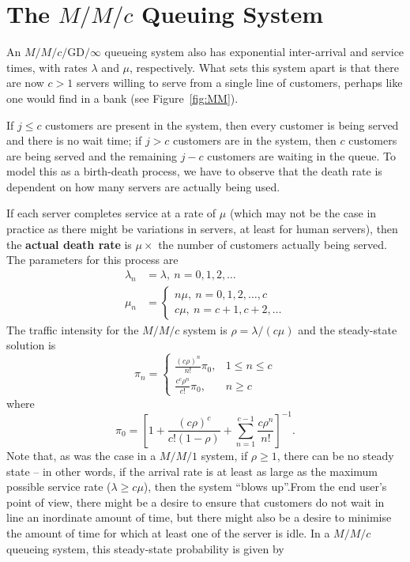 \section{The $M/M/c$ Queuing System}
An $M/M/c/\textrm{GD}/\infty$ queueing system also has exponential inter-arrival and service times, with rates $\lambda$ and $\mu$, respectively. What sets this system apart is that there are now $c>1$ servers willing to serve from a single line of customers, perhaps like one would find in a bank (see Figure~\ref{fig:MM}). \par If $j \leq c$ customers are present in the system, then every customer is being served and there is no wait time; if $j > c$ customers are in the system, then $c$ customers are being served and the remaining $j - c$ customers are waiting in the queue. \newl
To model this as a birth-death process, we have to observe that the death rate is dependent on how many servers are actually being used. \par If each server completes service at a rate of $\mu$ (which may not be the case in practice as there might be variations in servers, at least for human servers), then the \textbf{actual death rate} is $\mu \times$ the number of customers actually being served. The parameters for this process are
\begin{align*}
\lambda_{n} &= \lambda, \ n=0,1,2,\ldots \\ 
\mu_n &= \begin{cases}n\mu, \ n=0,1,2, \ldots, c \\
 c\mu,\  n=c+1,c+2,\ldots
\end{cases}
\end{align*}
The traffic intensity for the $M/M/c$ system is $\rho = \lambda/(c \mu)$ and the steady-state solution is 
$$
 \pi_{n} = 
\begin{cases}
     \frac{\left(c \rho\right)^{n}}{n!} \pi_{0},      & \text{$1\leq n \leq c$}  \\ 
     \frac{c^{c} \rho^{n}}{c!} \pi_{0},   & \text{$n \geq c$} 
\end{cases}
$$
where 
$$
\pi_{0} = \left[1 + \frac{\left(c \rho\right)^{c}}{c! \left(1-\rho\right)} + \sum^{c-1}_{n=1} \frac{c \rho^{n}}{n!}\right]^{-1}\!\!. $$
Note that, as was the case in a $M/M/1$ system, if $\rho \geq 1$, there can be no steady state -- in other words, if the arrival rate is at least as large as the maximum possible service rate ($\lambda \geq c \mu$), then the system ``blows up''.\newl From the end user's point of view, there might be a desire to ensure that customers do not wait in line an inordinate amount of time, but there might also be a desire to minimise the amount of time for which at least one of the server is idle. In a $M/M/c$ queueing system, this steady-state probability is given by 
